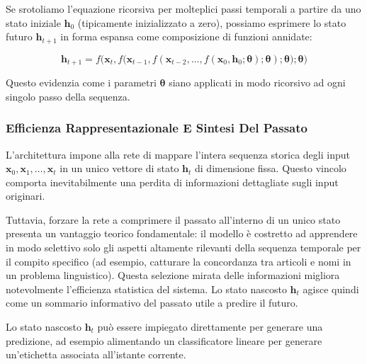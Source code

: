 ﻿\documentclass[11pt, a4paper]{article}
\begin{document}
Se srotoliamo l'equazione ricorsiva per molteplici passi temporali a partire da uno stato iniziale $\bm{h}_0$ (tipicamente inizializzato a zero), possiamo esprimere lo stato futuro $\bm{h}_{t+1}$ in forma espansa come composizione di funzioni annidate:

\[
\bm{h}_{t+1} = f\Big(\bm{x}_t, f\big(\bm{x}_{t-1}, f(\bm{x}_{t-2}, \dots, f(\bm{x}_0, \bm{h}_0; \bm{\theta}); \bm{\theta}); \bm{\theta}\big); \bm{\theta}\Big)
\]

Questo evidenzia come i parametri $\bm{\theta}$ siano applicati in modo ricorsivo ad ogni singolo passo della sequenza.


\subsubsection{Efficienza Rappresentazionale E Sintesi Del Passato}

L'architettura impone alla rete di mappare l'intera sequenza storica degli input $\bm{x}_0, \bm{x}_1, \dots, \bm{x}_t$ in un unico vettore di stato $\bm{h}_t$ di dimensione fissa. Questo vincolo comporta inevitabilmente una perdita di informazioni dettagliate sugli input originari.

Tuttavia, forzare la rete a comprimere il passato all'interno di un unico stato presenta un vantaggio teorico fondamentale: il modello è costretto ad apprendere in modo selettivo solo gli aspetti altamente rilevanti della sequenza temporale per il compito specifico (ad esempio, catturare la concordanza tra articoli e nomi in un problema linguistico). Questa selezione mirata delle informazioni migliora notevolmente l'efficienza statistica del sistema. Lo stato nascosto $\bm{h}_t$ agisce quindi come un sommario informativo del passato utile a predire il futuro.


Lo stato nascosto $\bm{h}_t$ può essere impiegato direttamente per generare una predizione, ad esempio alimentando un classificatore lineare per generare un'etichetta associata all'istante corrente.

\newpage
\end{document}
